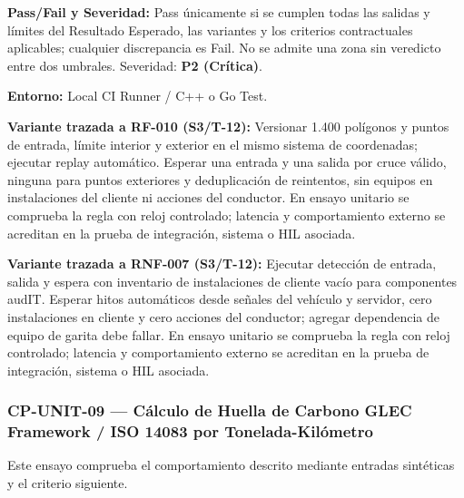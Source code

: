 \par\noindent\textbf{Pass/Fail y Severidad:} Pass únicamente si se cumplen todas las salidas y límites del Resultado Esperado, las variantes y los criterios contractuales aplicables; cualquier discrepancia es Fail. No se admite una zona sin veredicto entre dos umbrales. Severidad: \textbf{P2 (Crítica)}.\par
\par\noindent\textbf{Entorno:} Local CI Runner / C++ o Go Test.\par







\par\noindent\textbf{Variante trazada a RF-010 (S3/T-12):} Versionar 1.400 polígonos y puntos de entrada, límite interior y exterior en el mismo sistema de coordenadas; ejecutar replay automático. Esperar una entrada y una salida por cruce válido, ninguna para puntos exteriores y deduplicación de reintentos, sin equipos en instalaciones del cliente ni acciones del conductor. En ensayo unitario se comprueba la regla con reloj controlado; latencia y comportamiento externo se acreditan en la prueba de integración, sistema o HIL asociada.\par

\par\noindent\textbf{Variante trazada a RNF-007 (S3/T-12):} Ejecutar detección de entrada, salida y espera con inventario de instalaciones de cliente vacío para componentes audIT. Esperar hitos automáticos desde señales del vehículo y servidor, cero instalaciones en cliente y cero acciones del conductor; agregar dependencia de equipo de garita debe fallar. En ensayo unitario se comprueba la regla con reloj controlado; latencia y comportamiento externo se acreditan en la prueba de integración, sistema o HIL asociada.\par
\subsubsection*{CP-UNIT-09 — Cálculo de Huella de Carbono GLEC Framework / ISO 14083 por Tonelada-Kilómetro}\label{sec:9-cp-unit-09}
Este ensayo comprueba el comportamiento descrito mediante entradas sintéticas y el criterio siguiente.

